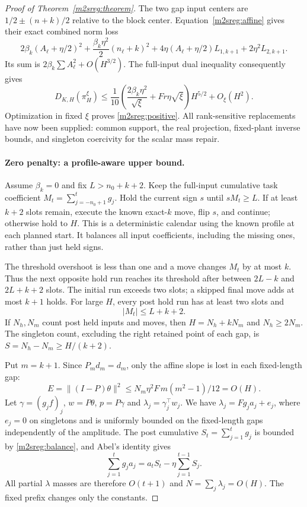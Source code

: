 \begin{proof}[Proof of Theorem~\ref{m2sreg:theorem}]
The two gap input centers are $1/2\pm(n+k)/2$ relative to the
block center. Equation~\eqref{m2sreg:affine} gives their exact
combined norm loss
\[
2\beta_k(A_\ell+\eta/2)^2+
 \frac{\beta_k\eta^2}{2}(n_\ell+k)^2+
4\eta(A_\ell+\eta/2)L_{1,k+1}+2\eta^2L_{2,k+1}.
\]
Its sum is $2\beta_k\sum A_\ell^2+O(H^{3/2})$.
The full-input dual inequality consequently gives
\begin{equation}\label{m2sreg:symmetricupper}
D_{K,H}(\pi_H^\xi)\le
\frac1{10}\left(\frac{2\beta_k\eta^2}{\sqrt\xi}
 +Fr\eta\sqrt\xi\right)H^{5/2}+O_\xi(H^2).
\end{equation}
Optimization in fixed $\xi$ proves \eqref{m2sreg:positive}.
All rank-sensitive replacements have now been supplied: common
support, the real projection, fixed-plant inverse bounds, and
singleton coercivity for the scalar mass repair.

\paragraph{Zero penalty: a profile-aware upper bound.}
Assume $\beta_k=0$ and fix $L>n_0+k+2$.
Keep the full-input cumulative task coefficient
$M_t=\sum_{j=-n_0+1}^t g_j$.
Hold the current sign $s$ until $sM_t\ge L$.
If at least $k+2$ slots remain, execute the known exact-$k$ move,
flip $s$, and continue; otherwise hold to $H$.
This is a deterministic calendar using the known profile at each
planned start. It balances all input coefficients, including the
missing ones, rather than just held signs.

The threshold overshoot is less than one and a move changes $M_t$
by at most $k$. Thus the next opposite hold run reaches its threshold
after between $2L-k$ and $2L+k+2$ slots.
The initial run exceeds two slots; a skipped final move adds at most
$k+1$ holds. For large $H$, every post hold run has at least two
slots and
\begin{equation}\label{m2sreg:balance}
|M_t|\le L+k+2 .
\end{equation}
If $N_h,N_m$ count post held inputs and moves, then
$H=N_h+kN_m$ and $N_h\ge2N_m$.
The singleton count, excluding the right retained point of each gap,
is $S=N_h-N_m\ge H/(k+2)$.

Put $m=k+1$. Since $P_md_m=d_m$, only the affine slope is lost
in each fixed-length gap:
\begin{equation}\label{m2sreg:slopeloss}
E=\|(I-P)\theta\|^2\le
N_m\eta^2F\,m(m^2-1)/12=O(H).
\end{equation}
Let $\gamma=(g_jf)_j$, $w=P\theta$, $p=P\gamma$ and
$\lambda_j=\gamma_j^\top w_j$.
We have $\lambda_j=Fg_ja_j+e_j$, where $e_j=0$ on singletons
and is uniformly bounded on the fixed-length gaps independently
of the amplitude. The post cumulative $S_t=\sum_{j=1}^tg_j$
is bounded by \eqref{m2sreg:balance}, and Abel's identity gives
\[
\sum_{j=1}^t g_ja_j=a_tS_t-\eta\sum_{j=1}^{t-1}S_j .
\]
All partial $\lambda$ masses are therefore $O(t+1)$ and
$N=\sum_j\lambda_j=O(H)$. The fixed prefix changes only the constants.


\end{proof}
